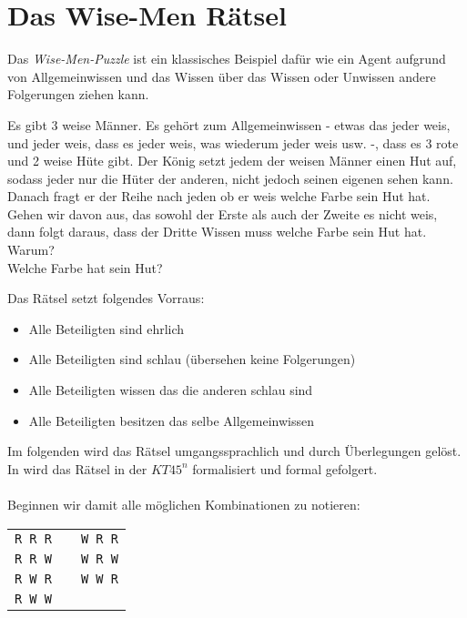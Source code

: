 

\section{Das Wise-Men Rätsel} %
\label{sub:das_wise_men_raetsel}

Das \emph{Wise-Men-Puzzle} ist ein klassisches Beispiel dafür wie ein Agent aufgrund von Allgemeinwissen und das Wissen über das Wissen oder Unwissen andere Folgerungen ziehen kann.

\begin{puzzle}
	\label{puz:wiseMen}
	Es gibt 3 weise Männer.
	Es gehört zum Allgemeinwissen - etwas das jeder weis, und jeder weis, dass es jeder weis, was wiederum jeder weis usw. -, dass es 3 rote und 2 weise Hüte gibt.
	Der König setzt jedem der weisen Männer einen Hut auf, sodass jeder nur die Hüter der anderen, nicht jedoch seinen eigenen sehen kann.
	Danach fragt er der Reihe nach jeden ob er weis welche Farbe sein Hut hat.
	Gehen wir davon aus, das sowohl der Erste als auch der Zweite es nicht weis, dann folgt daraus, dass der Dritte Wissen muss welche Farbe sein Hut hat.
	\\
	Warum?\\
	Welche Farbe hat sein Hut?
\end{puzzle}
%
%
Das Rätsel setzt folgendes Vorraus:
\begin{itemize}
	\item Alle Beteiligten sind ehrlich
	\item Alle Beteiligten sind schlau (übersehen keine Folgerungen)
	\item Alle Beteiligten wissen das die anderen schlau sind
	\item Alle Beteiligten besitzen das selbe Allgemeinwissen
\end{itemize}
%
%
Im folgenden wird das Rätsel umgangssprachlich und durch Überlegungen gelöst. In  wird das Rätsel in der \MML $KT45^n$ formalisiert und formal gefolgert.\\
\\
Beginnen wir damit alle möglichen Kombinationen zu notieren:\\
%
\begin{tabular}{ccc}
\texttt{R R R} &   & \texttt{W R R}\\
\texttt{R R W} &   & \texttt{W R W}\\
\texttt{R W R} &   & \texttt{W W R}\\
\texttt{R W W} &   &   \\
\end{tabular}
